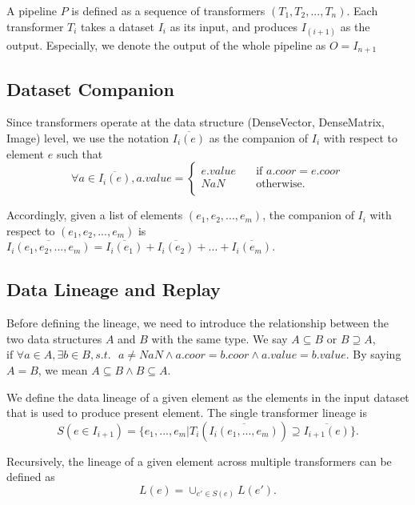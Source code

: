 \documentclass{sig-alternate}
\begin{document}
A pipeline $P$ is defined as a sequence of transformers $(T_1, T_2, ..., T_n)$. 
Each transformer $T_i$ takes a dataset $I_i$ as its input, and produces $I_{(i+1)}$ as the output. 
Especially, we denote the output of the whole pipeline as $O = I_{n+1}$

\subsection{Dataset Companion}
Since transformers operate at the data structure (DenseVector, DenseMatrix, Image) level, we use the notation
$\overline{I_i(e)}$ as the companion of $I_i$ with respect to element $e$ such that 
\[ \forall a \in \overline{I_i(e)}, a.value =
  \begin{cases}
    e.value       & \quad \text{if } a.coor = e.coor\\
    NaN  & \quad \text{otherwise}. \\
  \end{cases}
\]

Accordingly, given a list of elements $(e_1, e_2, ..., e_m)$, the companion of $I_i$ with respect to $(e_1, e_2, ..., e_m)$ is
$\overline{I_i(e_1, e_2, ..., e_m)} = \overline{I_i(e_1)} + \overline{I_i(e_2)} + ... +\overline{I_i(e_m)} $.

\subsection{Data Lineage and Replay}
Before defining the lineage, we need to introduce the relationship between the two data structures $A$ and $B$ with the same type.
We say $A \subseteq B \text{ or } B \supseteq A$, $\text{if }\forall a \in A, \exists b \in B, s.t.\text{ } a \neq NaN \land a.coor = b.coor \land a.value = b.value$.
By saying $A = B$, we mean $A \subseteq B \land B \subseteq A$.

We define the data lineage of a given element as the elements in the input dataset that is used to produce present element.
The single transformer lineage is
\begin{equation}
S(e \in I_{i+1}) = \{e_1, ..., e_m | T_i(\overline{I_i(e_1, ..., e_m)}) \supseteq \overline{I_{i+1}(e)}\}.
\label{equa:SingleLineage}
\end{equation}


Recursively, the lineage of a given element across multiple transformers can be defined as
\begin{equation}
L(e) = \cup_{e' \in S(e)} L(e').
\end{equation}
\end{document}
